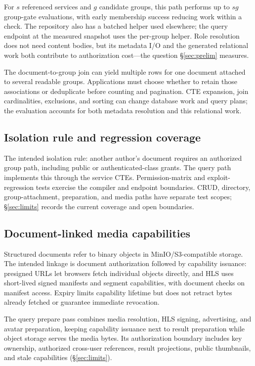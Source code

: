 \documentclass[sigconf, nonacm]{acmart}
\begin{document}
For $s$ referenced services and $g$ candidate groups, this path performs up
to $s g$ group-gate evaluations, with early membership success reducing work
within a check. The repository also has a batched helper used elsewhere; the
query endpoint at the measured snapshot uses the per-group helper. Role
resolution does not need content bodies, but its metadata I/O and the
generated relational work both contribute to authorization cost---the
question \S\ref{sec:prelim} measures.

The document-to-group join can yield multiple rows for one document attached
to several readable groups. Applications must choose whether to retain those
associations or deduplicate before counting and pagination. CTE expansion,
join cardinalities, exclusions, and sorting can change database work and
query plans; the evaluation accounts for both metadata resolution and this
relational work.

\subsection{Isolation rule and regression coverage}

The intended isolation rule: another author's document requires an
authorized group path, including public or authenticated-class grants. The
query path implements this through the service CTEs. Permission-matrix and
exploit-regression tests exercise the compiler and endpoint boundaries.
CRUD, directory, group-attachment, preparation, and media paths have
separate test scopes; \S\ref{sec:limits} records the current coverage and
open boundaries.

\subsection{Document-linked media capabilities}

Structured documents refer to binary objects in MinIO/S3-compatible storage.
The intended linkage is document authorization followed by capability
issuance: presigned URLs let browsers fetch individual objects directly, and
HLS uses short-lived signed manifests and segment capabilities, with
document checks on manifest access. Expiry limits capability lifetime but
does not retract bytes already fetched or guarantee immediate revocation.

The query prepare pass combines media resolution, HLS signing, advertising,
and avatar preparation, keeping capability issuance next to result
preparation while object storage serves the media bytes. Its authorization
boundary includes key ownership, authorized cross-user references, result
projections, public thumbnails, and stale capabilities
(\S\ref{sec:limits}).
\end{document}
